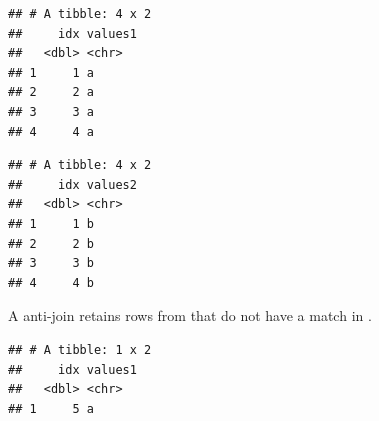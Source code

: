 \documentclass[krantz2]{krantz}\usepackage{knitr}
\begin{document}
\begin{knitrout}\footnotesize
{}\color{fgcolor}\begin{kframe}
\begin{alltt}
\hlstd{(}   
\end{alltt}


{\ttfamily\noindent\itshape{}}\begin{verbatim}
## # A tibble: 4 x 2
##     idx values1
##   <dbl> <chr>  
## 1     1 a      
## 2     2 a      
## 3     3 a      
## 4     4 a
\end{verbatim}
\end{kframe}
\end{knitrout}

\begin{knitrout}\footnotesize
{}\color{fgcolor}\begin{kframe}
\begin{alltt}
\hlstd{(}   
\end{alltt}


{\ttfamily\noindent\itshape{}}\begin{verbatim}
## # A tibble: 4 x 2
##     idx values2
##   <dbl> <chr>  
## 1     1 b      
## 2     2 b      
## 3     3 b      
## 4     4 b
\end{verbatim}
\end{kframe}
\end{knitrout}

A anti-join retains rows from  that do not have a match in .

\begin{knitrout}\footnotesize
{}\color{fgcolor}\begin{kframe}
\begin{alltt}
\hlstd{(}   
\end{alltt}


{\ttfamily\noindent\itshape{}}\begin{verbatim}
## # A tibble: 1 x 2
##     idx values1
##   <dbl> <chr>  
## 1     5 a
\end{verbatim}
\end{kframe}
\end{knitrout}
\end{document}
